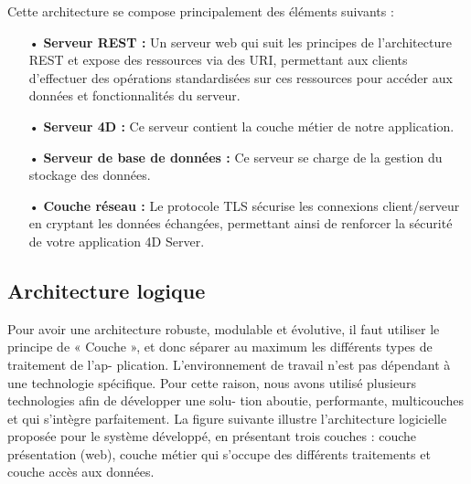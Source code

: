 Cette architecture se compose principalement des éléments suivants :
\begin{itemize}
   \item[•] \textbf{Serveur REST :} Un serveur web qui suit les principes de l’architecture REST et expose des ressources via des URI, permettant aux clients d’effectuer des opérations standardisées sur ces ressources pour accéder aux données et fonctionnalités du serveur.
   \item[•] \textbf{Serveur 4D :} Ce serveur contient la couche métier de notre application.
   \item[•] \textbf{Serveur de base de données :} Ce serveur se charge de la gestion du stockage des données.
   \item[•] \textbf{Couche réseau :} Le protocole TLS sécurise les connexions client/serveur en cryptant les données échangées, permettant ainsi de renforcer la sécurité de votre application 4D Server.
\end{itemize}

\subsection{Architecture logique}
Pour avoir une architecture robuste, modulable et évolutive, il faut utiliser le principe de « Couche », et donc séparer au maximum les différents types de traitement de l’ap- plication. L’environnement de travail n’est pas dépendant à une technologie spécifique. Pour cette raison, nous avons utilisé plusieurs technologies afin de développer une solu- tion aboutie, performante, multicouches et qui s’intègre parfaitement. La figure suivante illustre l’architecture logicielle proposée pour le système développé, en présentant trois couches : couche présentation (web), couche métier qui s’occupe des différents traitements et couche accès aux données.

